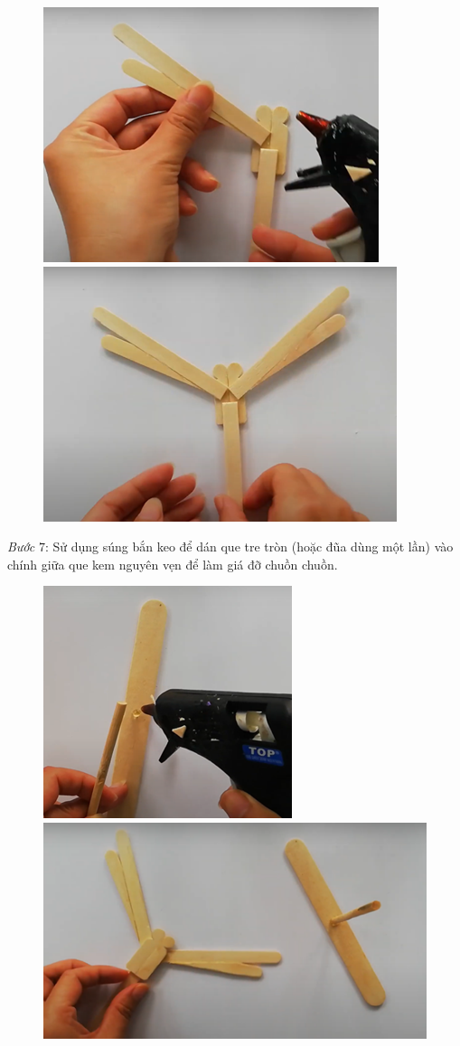 \begin{multicols}{2}
	\begin{figure}[H]
		\vspace*{-5pt}
		\centering
		\captionsetup{labelformat= empty, justification=centering}
		\includegraphics[height=0.36\linewidth]{56}
		\includegraphics[height=0.36\linewidth]{57}
		\vspace*{-10pt}
	\end{figure}
	\textit{Bước} $7$: Sử dụng súng bắn keo để dán que tre tròn (hoặc đũa dùng một lần) vào chính giữa que kem nguyên vẹn để làm giá đỡ chuồn chuồn.
	\begin{figure}[H]
		\vspace*{5pt}
		\centering
		\captionsetup{labelformat= empty, justification=centering}
		\includegraphics[height=0.34\linewidth]{58}
		\includegraphics[height=0.34\linewidth]{59}

\end{figure}
\end{multicols}
